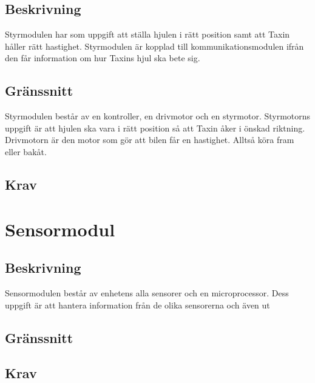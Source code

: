 \documentclass[kravspec/krav.tex]{subfiles}
\begin{document}
\subsection{Beskrivning}
Styrmodulen har som uppgift att ställa hjulen i rätt position samt att Taxin håller rätt hastighet. Styrmodulen är kopplad till kommunikationsmodulen ifrån den får information om hur Taxins hjul ska bete sig.
\subsection{Gränssnitt}
Styrmodulen består av en kontroller, en drivmotor och en styrmotor. Styrmotorns uppgift är att hjulen ska vara i rätt position så att Taxin åker i önskad riktning. Drivmotorn är den motor som gör att bilen får en hastighet. Alltså köra fram eller bakåt.
\subsection{Krav}
\begin{reqlist}
    \req{}
\end{reqlist}
\clearpage
\section{Sensormodul}
\subsection{Beskrivning}
Sensormodulen består av enhetens alla sensorer och en microprocessor. Dess
uppgift är att hantera information från de olika sensorerna och även
ut
\subsection{Gränssnitt}
\subsection{Krav}
\end{document}
